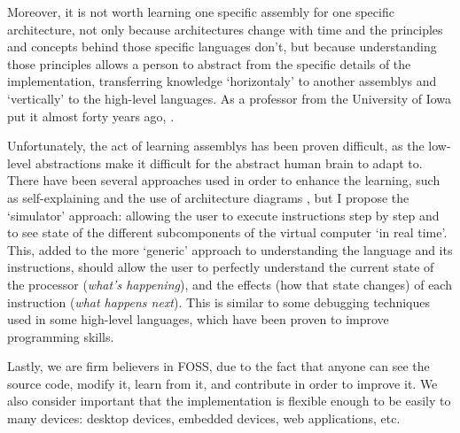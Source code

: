 Moreover, it is not worth learning one specific \gls{assembly} for one specific architecture, not only because architectures change with time and the principles and concepts behind those specific languages don't, but because understanding those principles allows a person to abstract from the specific details of the implementation, transferring knowledge `horizontaly' to another \glspl{assembly} and `vertically' to the \glspl{high-level language}. As a professor from the University of Iowa put it almost forty years ago, .


Unfortunately, the act of learning \glspl{assembly} has been proven difficult, as the low-level abstractions make it difficult for the abstract human brain to adapt to. There have been several approaches used in order to enhance the learning, such as self-explaining and the use of architecture diagrams \supercite{HungY.-C2012CSWC}, but I propose the `simulator' approach: allowing the user to execute instructions step by step and to see state of the different subcomponents of the virtual \gls{computer} `in real time'. This, added to the more `generic' approach to understanding the language and its instructions, should allow the user to perfectly understand the current state of the processor (\textit{what's happening}), and the effects (how that state changes) of each instruction (\textit{what happens next}). This is similar to some \gls{debugging} techniques used in some \glspl{high-level language}, which have been proven to improve programming skills\supercite{KLAHR1988362}.


Lastly, we are firm believers in \gls{FOSS}, due to the fact that anyone can see the source code, modify it, learn from it, and contribute in order to improve it. We also consider important that the implementation is flexible enough to be easily  to many devices: \glspl{desktop device}, \glspl{embedded device}, \glspl{web application}, etc.







